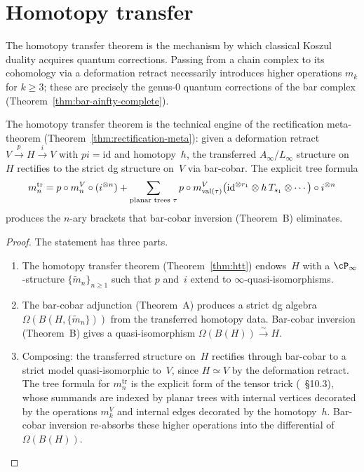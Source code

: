 \chapter{Homotopy transfer}
\label{app:homotopy-transfer}


The homotopy
transfer theorem is the mechanism by which classical Koszul duality
acquires quantum corrections. Passing from a chain complex to its
cohomology via a deformation retract necessarily introduces higher
operations $m_k$ for $k \geq 3$; these are precisely the genus-$0$
quantum corrections of the bar complex
(Theorem~\ref{thm:bar-ainfty-complete}).

\begin{proposition}
\label{prop:htt-rectification}
\ClaimStatusConditional
The homotopy transfer theorem is the technical engine of the
rectification meta-theorem
(Theorem~\ref{thm:rectification-meta}): given a deformation retract
$V \xrightarrow{p} H \xrightarrow{i} V$ with $pi = \mathrm{id}$
and homotopy~$h$, the transferred
$A_\infty$/$L_\infty$ structure on~$H$ rectifies to the strict dg
structure on~$V$ via bar-cobar. The explicit tree formula
\[
m_n^{\mathrm{tr}}
= p \circ m_n^V \circ (i^{\otimes n})
 + \sum_{\textup{planar trees }\tau}
 p \circ m^V_{\operatorname{val}(\tau)}
 \bigl(\mathrm{id}^{\otimes r_1} \otimes h\,T_{s_1}
 \otimes \cdots \bigr) \circ i^{\otimes n}
\]
produces the $n$-ary brackets that bar-cobar inversion
(Theorem~\textup{B}) eliminates.
\end{proposition}

\begin{proof}
The statement has three parts.
\begin{enumerate}[label=\textup{(\roman*)}]
\item The homotopy transfer theorem
 (Theorem~\ref{thm:htt}) endows~$H$
 with a $\cP_\infty$-structure $\{\tilde m_n\}_{n\ge 1}$
 such that $p$ and~$i$ extend to $\infty$-quasi-isomorphisms.
\item The bar-cobar adjunction (Theorem~\textup{A}) produces a
 strict dg algebra $\Omega(B(H,\{\tilde m_n\}))$ from the
 transferred homotopy data. Bar-cobar inversion (Theorem~\textup{B})
 gives a quasi-isomorphism
 $\Omega(B(H)) \xrightarrow{\sim} H$.
\item Composing: the transferred structure on~$H$ rectifies
 through bar-cobar to a strict model quasi-isomorphic to~$V$,
 since $H \simeq V$ by the deformation retract. The tree
 formula for $m_n^{\mathrm{tr}}$ is the explicit form of the
 tensor trick (\cite{LV12}~\S10.3), whose summands are indexed
 by planar trees with internal vertices decorated by the
 operations $m_k^V$ and internal edges decorated by the
 homotopy~$h$. Bar-cobar inversion re-absorbs these
 higher operations into the differential of~$\Omega(B(H))$.
\end{enumerate}
\end{proof}

